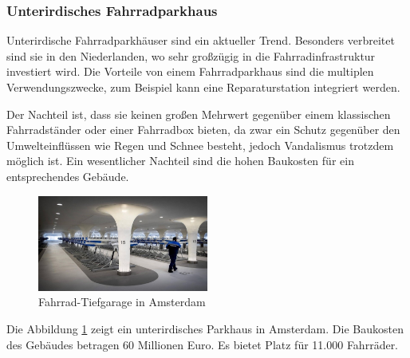 \subsubsection{Unterirdisches Fahrradparkhaus}
Unterirdische Fahrradparkhäuser sind ein aktueller Trend. Besonders verbreitet sind sie in den Niederlanden, wo sehr großzügig in die Fahrradinfrastruktur investiert wird. Die Vorteile von einem Fahrradparkhaus sind die multiplen Verwendungszwecke, zum Beispiel kann eine Reparaturstation integriert werden.

\smallskip \noindent Der Nachteil ist, dass sie keinen großen Mehrwert gegenüber einem klassischen Fahrradständer oder einer Fahrradbox bieten, da zwar ein Schutz gegenüber den Umwelteinflüssen wie Regen und Schnee besteht, jedoch Vandalismus trotzdem möglich ist. Ein wesentlicher Nachteil sind die hohen Baukosten für ein entsprechendes Gebäude.

\begin{figure}[H]
    \centering
    \includegraphics[width=0.5\textwidth]{images/unterirdischesfahrradparkhaus.jpg}
    \caption{Fahrrad-Tiefgarage in Amsterdam }
    \label{fig:fahradtiefgarage}
\end{figure}

\noindent Die Abbildung \ref{fig:fahradtiefgarage} zeigt ein unterirdisches Parkhaus in Amsterdam. Die Baukosten des Gebäudes betragen 60 Millionen Euro. Es bietet Platz für 11.000 Fahrräder.
